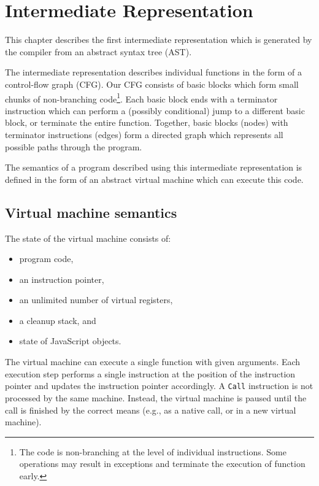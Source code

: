 \chapter{Intermediate Representation}\label{ir}

This chapter describes the first intermediate representation which is generated by the compiler from an abstract syntax tree (AST).

The intermediate representation describes individual functions in the form of a control-flow graph (CFG). Our CFG consists of basic blocks which form small chunks of non-branching code\footnote{The code is non-branching at the level of individual instructions. Some operations may result in exceptions and terminate the execution of function early.}. Each basic block ends with a terminator instruction which can perform a (possibly conditional) jump to a different basic block, or terminate the entire function. Together, basic blocks (nodes) with terminator instructions (edges) form a directed graph which represents all possible paths through the program.

The semantics of a program described using this intermediate representation is defined in the form of an abstract virtual machine which can execute this code.


\section{Virtual machine semantics}\label{ir:vm}

The state of the virtual machine consists of:
\begin{itemize}
    \item program code,
    \item an instruction pointer,
    \item an unlimited number of virtual registers,
    \item a cleanup stack, and
    \item state of JavaScript objects.
\end{itemize}

The virtual machine can execute a single function with given arguments. Each execution step performs a single instruction at the position of the instruction pointer and updates the instruction pointer accordingly. A \texttt{Call} instruction is not processed by the same machine. Instead, the virtual machine is paused until the call is finished by the correct means (e.g., as a native call, or in a new virtual machine).

